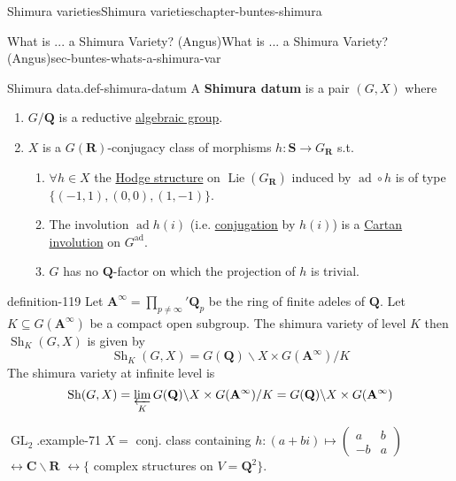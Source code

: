 \documentclass[oneside,10pt,]{book}
\newcommand{\terminology}[1]{\textbf{#1}}
\numberwithin{equation}{section}
\newcommand{\Lie}{\operatorname{Lie}}
\newcommand{\QQ}{\mathbf{Q}}
\newcommand{\RR}{\mathbf{R}}
\newcommand{\CC}{\mathbf{C}}
\newcommand{\adeles}{\mathbf{A}}
\DeclareMathOperator{\ad}{ad}
\DeclareMathOperator{\GL}{GL}
\newcommand{\amp}{&}
\begin{document}
\begin{chapterptx}{Shimura varieties}{}{Shimura varieties}{}{}{chapter-buntes-shimura}
\begin{sectionptx}{What is ... a Shimura Variety? (Angus)}{}{What is ... a Shimura Variety? (Angus)}{}{}{sec-buntes-whats-a-shimura-var}
\begin{definition}{Shimura data.}{def-shimura-datum}
\hypertarget{p-1238}{}%
A \terminology{Shimura datum} is a pair \((G,X)\) where\leavevmode%
\begin{enumerate}
\item\hypertarget{li-300}{}\(G/\QQ\) is a reductive \hyperref[def-alg-gp]{algebraic group}.%
\item\hypertarget{li-301}{}\hypertarget{p-1239}{}%
\(X\) is a \(G(\RR)\)-conjugacy class of morphisms \(h\colon \mathbf  S \to  G_\RR\) s.t.%
\begin{enumerate}
\item\hypertarget{li-302}{}\(\forall h \in X\) the \hyperref[def-hodge-str]{Hodge structure} on \(\Lie (G_\RR)\) induced by \(\ad \circ h\) is of type \(\{(-1,1), (0,0), (1,-1)\}\).%
\item\hypertarget{li-303}{}The involution \(\ad h(i)\) (i.e. \hyperref[def-quat-alg-conj-trace-norm]{conjugation} by \(h(i)\)) is a \hyperref[def-cartan-inv]{Cartan involution} on \(G^{\ad}\).%
\item\hypertarget{li-304}{}\(G\) has no \(\QQ\)-factor on which the projection of \(h\) is trivial.%
\end{enumerate}
%
\end{enumerate}
%
\end{definition}
\begin{definition}{}{definition-119}%
\hypertarget{p-1240}{}%
Let \(\adeles^\infty = \prod_{p\ne \infty}' \QQ_p\) be the ring of finite adeles of \(\QQ\). Let \(K \subseteq G(\adeles^\infty)\) be a compact open subgroup. The shimura variety of level \(K\) then \({\operatorname{Sh}}_K(G,X)\) is given by%
\begin{equation*}
{\operatorname{Sh}}_K(G,X) = G(\QQ)  \backslash X\times G(\adeles^\infty) / K
\end{equation*}
The shimura variety at infinite level is%
\begin{equation*}
{\operatorname{Sh}}(G,X) = \varprojlim_K G(\QQ) \backslash  X \times G(\adeles^\infty) / K = G(\QQ) \backslash X \times G(\adeles^\infty)
\end{equation*}
%
\end{definition}
\begin{example}{\(\GL_2\).}{example-71}%
\hypertarget{p-1241}{}%
\(X = \) conj. class containing \(h \colon (a+bi) \mapsto \begin{pmatrix} a\amp b \\ -b \amp a\end{pmatrix}\) \(\leftrightarrow \CC \smallsetminus \RR\) \(\leftrightarrow \{\) complex structures on \(V = \QQ^2\}\).%

\end{example}
\end{sectionptx}
\end{chapterptx}
\end{document}
